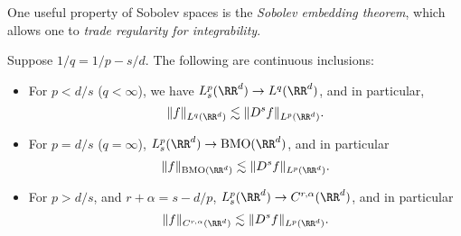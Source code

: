 One useful property of Sobolev spaces is the \emph{Sobolev embedding theorem}, which allows one to \emph{trade regularity for integrability}.

\begin{lemma}
    Suppose $1/q = 1/p - s/d$. The following are continuous inclusions:
    \begin{itemize}
        \item For $p < d/s$ ($q < \infty$), we have $L^p_s(\RR^d) \to L^q(\RR^d)$, and in particular,
        \[ \| f \|_{L^q(\RR^d)} \lesssim \| D^s f \|_{L^p(\RR^d)}. \]
        \item For $p = d/s$ ($q = \infty$), $L^p_s(\RR^d) \to \text{BMO}(\RR^d)$, and in particular
        \[ \| f \|_{\text{BMO}(\RR^d)} \lesssim \| D^s f \|_{L^p(\RR^d)}. \]

        \item For $p > d/s$, and $r + \alpha = s - d/p$, $L^p_s(\RR^d) \to C^{r,\alpha}(\RR^d)$, and in particular
        \[ \| f \|_{C^{r,\alpha}(\RR^d)} \lesssim \| D^s f \|_{L^p(\RR^d)}. \]
    \end{itemize}
\end{lemma}
